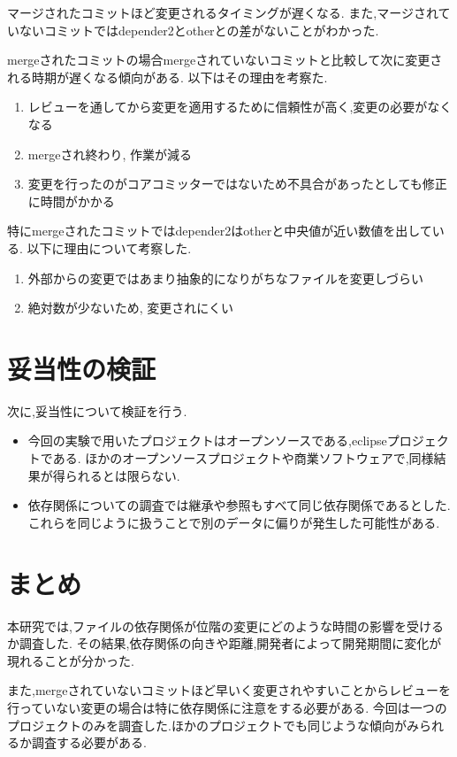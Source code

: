 \documentclass[submit,ses,noauthor]{ipsj} %
\begin{document}
マージされたコミットほど変更されるタイミングが遅くなる.
また,マージされていないコミットではdepender2とotherとの差がないことがわかった.



mergeされたコミットの場合mergeされていないコミットと比較して次に変更される時期が遅くなる傾向がある.
以下はその理由を考察た.
\begin{enumerate}
\item レビューを通してから変更を適用するために信頼性が高く,変更の必要がなくなる
\item mergeされ終わり, 作業が減る
\item 変更を行ったのがコアコミッターではないため不具合があったとしても修正に時間がかかる
\end{enumerate}

特にmergeされたコミットではdepender2はotherと中央値が近い数値を出している.
以下に理由について考察した.

\begin{enumerate}
\item 外部からの変更ではあまり抽象的になりがちなファイルを変更しづらい
\item 絶対数が少ないため, 変更されにくい
\end{enumerate}

\section{妥当性の検証}\label{妥当性の検証}
次に,妥当性について検証を行う.

\begin{itemize}
\item 今回の実験で用いたプロジェクトはオープンソースである,eclipseプロジェクトである.
ほかのオープンソースプロジェクトや商業ソフトウェアで,同様結果が得られるとは限らない.

\item 依存関係についての調査では継承や参照もすべて同じ依存関係であるとした.
これらを同じように扱うことで別のデータに偏りが発生した可能性がある.
\end{itemize}


\section{まとめ} \label{まとめ}
本研究では,ファイルの依存関係が位階の変更にどのような時間の影響を受けるか調査した.
その結果,依存関係の向きや距離,開発者によって開発期間に変化が現れることが分かった.

また,mergeされていないコミットほど早いく変更されやすいことからレビューを行っていない変更の場合は特に依存関係に注意をする必要がある.
今回は一つのプロジェクトのみを調査した.ほかのプロジェクトでも同じような傾向がみられるか調査する必要がある.
\end{document}
